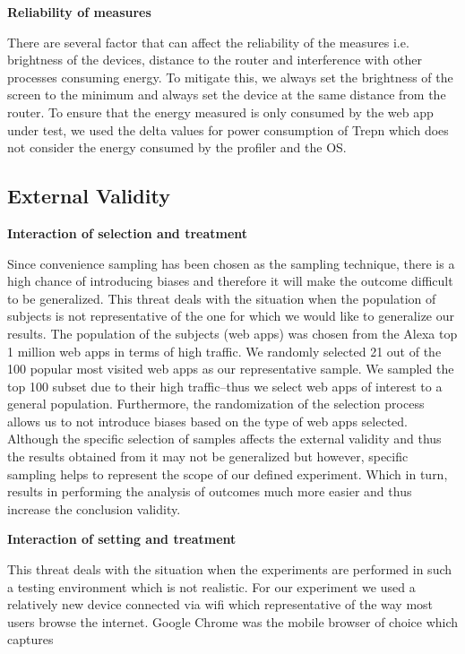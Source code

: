 \textbf{Reliability of measures}

There are several factor that can affect the reliability of the measures i.e. brightness of the devices, distance to the router and interference with other processes consuming energy. To mitigate this, we always set the brightness of the screen to the minimum and always set the device at the same distance from the router. To ensure that the energy measured is only consumed by the web app under test, we used the delta values for power consumption of Trepn which does not consider the energy consumed by the profiler and the OS. 




\subsection{External Validity}

\textbf{Interaction of selection and treatment}

Since convenience sampling has been chosen as the sampling technique, there is a high chance of introducing biases and therefore it will make the outcome difficult to be generalized. This threat deals with the situation when the population of subjects is not representative of the one for which we would like to generalize our results. The population of the subjects (web apps) was chosen from the Alexa top 1 million web apps in terms of high traffic. We randomly selected 21 out of the 100 popular most visited web apps as our representative sample. We sampled the top 100 subset due to their high traffic--thus we select web apps of interest to a general population.  Furthermore, the randomization of the selection process allows us to not introduce biases based on the type of web apps selected.  
Although the specific selection of samples affects the external validity and thus the results obtained from it may not be generalized but however, specific sampling helps to represent the scope of our defined experiment. Which in turn, results in performing the analysis of outcomes much more easier and thus increase the conclusion validity. \newline


\textbf{Interaction of setting and treatment}

This threat deals with the situation when the experiments are performed in such a testing environment which is not realistic. For our experiment we used a relatively new device connected via wifi which representative of the way most users browse the internet. Google Chrome was the mobile browser of choice which captures 



